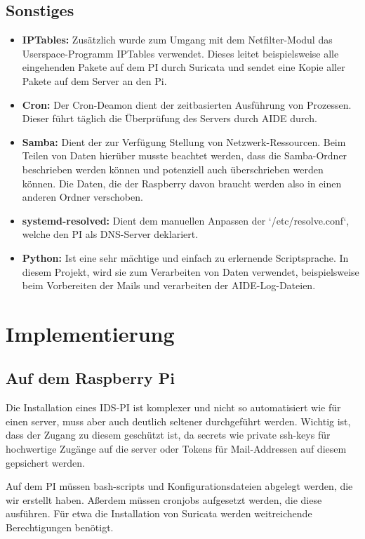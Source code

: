 \documentclass{article}
\begin{document}
\subsection{Sonstiges}
\begin{itemize}
    \item \textbf{IPTables:} Zusätzlich wurde zum Umgang mit dem Netfilter-Modul das Userspace-Programm IPTables verwendet. Dieses leitet beispielsweise alle eingehenden Pakete auf dem PI durch Suricata und sendet eine Kopie aller Pakete auf dem Server an den Pi.
    \item \textbf{Cron:} Der Cron-Deamon dient der zeitbasierten Ausführung von Prozessen. Dieser führt täglich die Überprüfung des Servers durch AIDE durch.
    \item \textbf{Samba:} Dient der zur Verfügung Stellung von Netzwerk-Ressourcen. Beim Teilen von Daten hierüber musste beachtet werden, dass die Samba-Ordner beschrieben werden können und potenziell auch überschrieben werden können. Die Daten, die der Raspberry davon braucht werden also in einen anderen Ordner verschoben.
    \item \textbf{systemd-resolved:} Dient dem manuellen Anpassen der `/etc/resolve.conf`, welche den PI als DNS-Server deklariert.
    \item \textbf{Python:} Ist eine sehr mächtige und einfach zu erlernende Scriptsprache. In diesem Projekt, wird sie zum Verarbeiten von Daten verwendet, beispielsweise beim Vorbereiten der Mails und verarbeiten der AIDE-Log-Dateien.
\end{itemize}

\section{Implementierung}

\subsection{Auf dem Raspberry Pi}
Die Installation eines IDS-PI ist komplexer und nicht so automatisiert wie für einen server, muss aber auch deutlich seltener durchgeführt werden. Wichtig ist, dass der Zugang zu diesem geschützt ist, da secrets wie private ssh-keys für hochwertige Zugänge auf die server oder Tokens für Mail-Addressen auf diesem gepsichert werden.

Auf dem PI müssen bash-scripts und Konfigurationsdateien abgelegt werden, die wir erstellt haben. Aßerdem müssen cronjobs aufgesetzt werden, die diese ausführen. Für etwa die Installation von Suricata werden weitreichende Berechtigungen benötigt.
\end{document}
